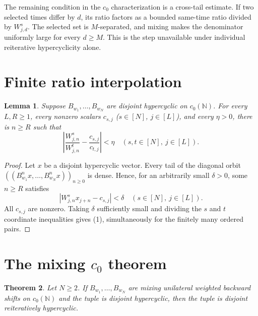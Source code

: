 \documentclass[11pt]{article}
\newtheorem{theorem}{Theorem}
\newtheorem{lemma}[theorem]{Lemma}
\newcommand{\N}{\mathbb N}
\begin{document}
The remaining condition in the $c_0$ characterization is a cross-tail
estimate.  If two selected times differ by $d$, its ratio factors as a
bounded same-time ratio divided by $W^s_{j,d}$.  The selected set is
$M$-separated, and mixing makes the denominator uniformly large for every
$d\geq M$.  This is the step unavailable under individual reiterative
hypercyclicity alone.

\section{Finite ratio interpolation}

\begin{lemma}\label{lem:interp}
Suppose $B_{w_1},\ldots,B_{w_N}$ are disjoint hypercyclic on $c_0(\N)$.
For every $L,R\geq1$, every nonzero scalars
$c_{s,j}$ ($s\in[N]$, $j\in[L]$), and every $\eta>0$, there is $n\geq R$
such that
\[
 \left|\frac{W^s_{j,n}}{W^t_{j,n}}-
             \frac{c_{s,j}}{c_{t,j}}\right|<\eta
 \quad(s,t\in[N],\ j\in[L]).                              \tag{1}
\]
\end{lemma}

\begin{proof}
Let $x$ be a disjoint hypercyclic vector.  Every tail of the diagonal orbit
$((B_{w_1}^n x,\ldots,B_{w_N}^n x))_{n\geq0}$ is dense.  Hence, for an
arbitrarily small $\delta>0$, some $n\geq R$ satisfies
\[
 |W^s_{j,n}x_{j+n}-c_{s,j}|<\delta
 \quad(s\in[N],\ j\in[L]).
\]
All $c_{s,j}$ are nonzero.  Taking $\delta$ sufficiently small and dividing
the $s$ and $t$ coordinate inequalities gives (1), simultaneously for the
finitely many ordered pairs.
\end{proof}

\section{The mixing $c_0$ theorem}

\begin{theorem}\label{thm:main}
Let $N\geq2$.  If $B_{w_1},\ldots,B_{w_N}$ are mixing unilateral weighted
backward shifts on $c_0(\N)$ and the tuple is disjoint hypercyclic, then the
tuple is disjoint reiteratively hypercyclic.
\end{theorem}
\end{document}
